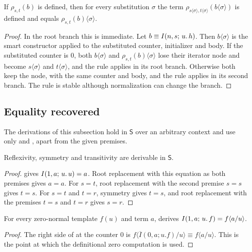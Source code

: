 \begin{lemma}
\label{comp:lem:seedsubst}
If $\rho_{s,t}(b)$ is defined, then for every substitution $\sigma$ the term
$\rho_{s\langle\sigma\rangle,t\langle\sigma\rangle}(b\langle\sigma\rangle)$
is defined and equals $\rho_{s,t}(b)\langle\sigma\rangle$.
\end{lemma}

\begin{proof}
In the root branch this is immediate. Let $b\equiv I(n,s;\,u.\,h)$. Then
$b\langle\sigma\rangle$ is the smart constructor applied to the substituted
counter, initializer and body. If the substituted counter is $0$, both
$b\langle\sigma\rangle$ and $\rho_{s,t}(b)\langle\sigma\rangle$ lose their
iterator node and become $s\langle\sigma\rangle$ and
$t\langle\sigma\rangle$, and the rule applies in its root branch. Otherwise
both keep the node, with the same counter and body, and the rule applies in
its second branch. The rule is stable although normalization can change the
branch.
\end{proof}

\subsection{Equality recovered}

The derivations of this subsection hold in $\mathsf{S}$ over an arbitrary
context and use only  and , apart from the given
premises.

\begin{lemma}
\label{comp:lem:seedalg}
Reflexivity, symmetry and transitivity are derivable in $\mathsf{S}$.
\end{lemma}

\begin{proof}
 gives $I(1,a;\,u.\,u)=a$. Root replacement with this
equation as both premises gives $a=a$. For $s=t$, root replacement with the
second premise $s=s$ gives $t=s$. For $s=t$ and $t=r$, symmetry gives
$t=s$, and root replacement with the premises $t=s$ and $t=r$ gives $s=r$.
\end{proof}

\begin{lemma}
\label{comp:lem:beta}
For every zero-normal template $f(u)$ and term $a$,  derives
$I(1,a;\,u.\,f)=f\langle a/u\rangle$.
\end{lemma}

\begin{proof}
The right side of  at the counter $0$ is
$f\langle\overline{I}(0,a;u.f)/u\rangle\equiv f\langle a/u\rangle$. This is
the point at which the definitional zero computation is used.
\end{proof}

